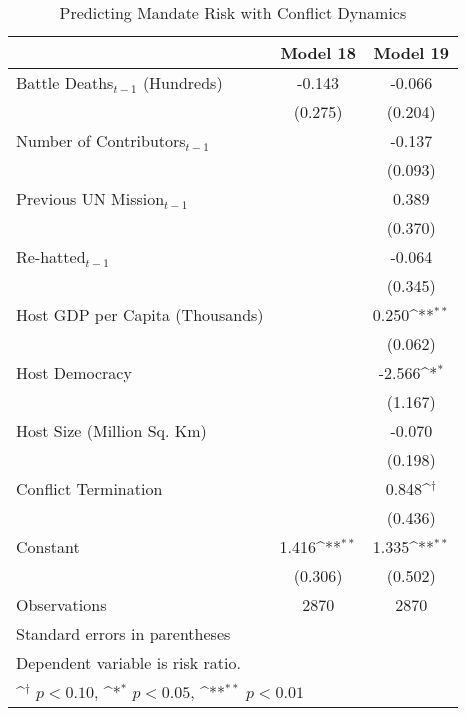\begin{table}[htbp]\centering
\footnotesize
\def\sym#1{\ifmmode^{#1}\else\(^{#1}\)\fi}
\caption{Predicting Mandate Risk with Conflict Dynamics\label{Fraq}}
\begin{tabular}{l*{2}{c}}
\hline\hline
                    &\multicolumn{1}{c}{Model 18}        &\multicolumn{1}{c}{Model 19}        \\
\hline
Battle Deaths$_{t-1}$ (Hundreds)&      -0.143        &      -0.066        \\
                    &     (0.275)        &     (0.204)        \\
[0.5em]
Number of Contributors$_{t-1}$&                    &      -0.137        \\
                    &                    &     (0.093)        \\
[0.5em]
Previous UN Mission$_{t-1}$ &                    &       0.389        \\
                    &                    &     (0.370)        \\
[0.5em]
Re-hatted$_{t-1}$           &                    &      -0.064        \\
                    &                    &     (0.345)        \\
[0.5em]
Host GDP per Capita (Thousands)&                    &       0.250\sym{**}\\
                    &                    &     (0.062)        \\
[0.5em]
Host Democracy      &                    &      -2.566\sym{*} \\
                    &                    &     (1.167)        \\
[0.5em]
Host Size (Million Sq. Km)&                    &      -0.070        \\
                    &                    &     (0.198)        \\
[0.5em]
Conflict Termination&                    &       0.848\sym{\dagger} \\
                    &                    &     (0.436)        \\
[0.5em]
Constant            &       1.416\sym{**}&       1.335\sym{**}\\
                    &     (0.306)        &     (0.502)        \\
\hline
Observations        &        2870        &        2870        \\
\hline\hline
\multicolumn{3}{l}{\scriptsize Standard errors in parentheses}\\
\multicolumn{3}{l}{\scriptsize Dependent variable is risk ratio.}\\
\multicolumn{3}{l}{\scriptsize \sym{\dagger} \(p<0.10\), \sym{*} \(p<0.05\), \sym{**} \(p<0.01\)}\\
\end{tabular}
\end{table}
